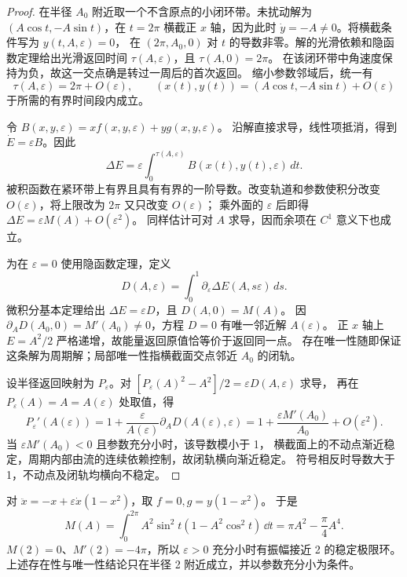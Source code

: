\begin{proof}
在半径 $A_0$ 附近取一个不含原点的小闭环带。未扰动解为
$(A\cos t,-A\sin t)$，在 $t=2\pi$ 横截正 $x$ 轴，因为此时
$\dot y=-A\ne0$。将横截条件写为 $y(t,A,\varepsilon)=0$，
在 $(2\pi,A_0,0)$ 对 $t$ 的导数非零。解的光滑依赖和隐函数定理给出光滑返回时间
$\tau(A,\varepsilon)$，且 $\tau(A,0)=2\pi$。
在该闭环带中角速度保持为负，故这一交点确是转过一周后的首次返回。
缩小参数邻域后，统一有
\[
 \tau(A,\varepsilon)=2\pi+O(\varepsilon),\qquad
 (x(t),y(t))=(A\cos t,-A\sin t)+O(\varepsilon)
\]
于所需的有界时间段内成立。

令 $B(x,y,\varepsilon)=xf(x,y,\varepsilon)+yg(x,y,\varepsilon)$。
沿解直接求导，线性项抵消，得到 $\dot E=\varepsilon B$。因此
\[
 \Delta E=\varepsilon\int_0^{\tau(A,\varepsilon)}B(x(t),y(t),\varepsilon)\,dt.
\]
被积函数在紧环带上有界且具有有界的一阶导数。改变轨道和参数使积分改变
$O(\varepsilon)$，将上限改为 $2\pi$ 又只改变 $O(\varepsilon)$；
乘外面的 $\varepsilon$ 后即得 $\Delta E=\varepsilon M(A)+O(\varepsilon^2)$。
同样估计可对 $A$ 求导，因而余项在 $C^1$ 意义下也成立。

为在 $\varepsilon=0$ 使用隐函数定理，定义
\[
 D(A,\varepsilon)=\int_0^1\partial_\varepsilon
 \Delta E(A,s\varepsilon)\,ds.
\]
微积分基本定理给出 $\Delta E=\varepsilon D$，且 $D(A,0)=M(A)$。
因 $\partial_AD(A_0,0)=M'(A_0)\ne0$，方程 $D=0$ 有唯一邻近解 $A(\varepsilon)$。
正 $x$ 轴上 $E=A^2/2$ 严格递增，故能量返回原值恰等价于返回同一点。
存在唯一性随即保证这条解为周期解；局部唯一性指横截面交点邻近 $A_0$ 的闭轨。

设半径返回映射为 $P_\varepsilon$。对
$[P_\varepsilon(A)^2-A^2]/2=\varepsilon D(A,\varepsilon)$ 求导，
再在 $P_\varepsilon(A)=A=A(\varepsilon)$ 处取值，得
\[
 P_\varepsilon'(A(\varepsilon))
 =1+\frac{\varepsilon}{A(\varepsilon)}\partial_AD(A(\varepsilon),\varepsilon)
 =1+\frac{\varepsilon M'(A_0)}{A_0}+O(\varepsilon^2).
\]
当 $\varepsilon M'(A_0)<0$ 且参数充分小时，该导数模小于 1，
横截面上的不动点渐近稳定，周期内部由流的连续依赖控制，故闭轨横向渐近稳定。
符号相反时导数大于 1，不动点及闭轨均横向不稳定。
\end{proof}
\begin{example}
对 $\ddot x=-x+\varepsilon\dot x(1-x^2)$，取 $f=0,g=y(1-x^2)$。
于是
\[
 M(A)=\int_0^{2\pi}A^2\sin^2t(1-A^2\cos^2t)\,\dd t
 =\pi A^2-\frac\pi4A^4.
\]
$M(2)=0$、$M'(2)=-4\pi$，所以 $\varepsilon>0$ 充分小时有振幅接近 2 的稳定极限环。
上述存在性与唯一性结论只在半径 2 附近成立，并以参数充分小为条件。
\end{example}


